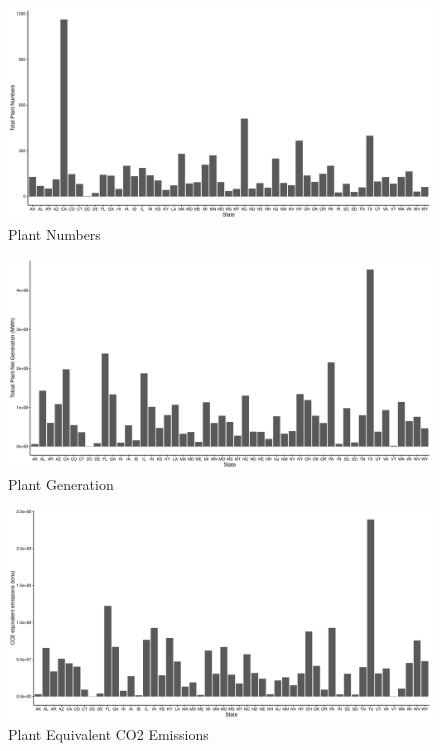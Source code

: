 \documentclass[12pt,]{article}
\begin{document}
\begin{figure}
\centering
\includegraphics{Zhang_X_ENV872_Project_files/figure-latex/unnamed-chunk-3-1.pdf}
\caption{Plant Numbers}
\end{figure}

\begin{figure}
\centering
\includegraphics{Zhang_X_ENV872_Project_files/figure-latex/unnamed-chunk-4-1.pdf}
\caption{Plant Generation}
\end{figure}

\begin{figure}
\centering
\includegraphics{Zhang_X_ENV872_Project_files/figure-latex/unnamed-chunk-5-1.pdf}
\caption{Plant Equivalent CO2 Emissions}
\end{figure}
\end{document}
